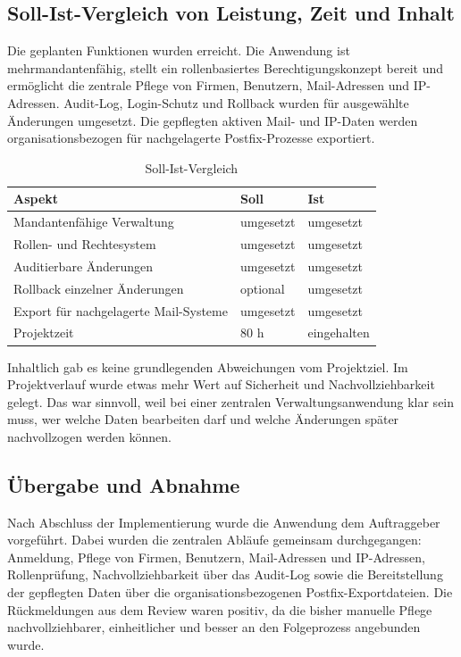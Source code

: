 \subsection{Soll-Ist-Vergleich von Leistung, Zeit und Inhalt}
\label{sec:SollIstVergleich}
Die geplanten Funktionen wurden erreicht. Die Anwendung ist
mehrmandantenfähig, stellt ein rollenbasiertes Berechtigungskonzept bereit und
ermöglicht die zentrale Pflege von Firmen, Benutzern, Mail-Adressen
und IP-Adressen. Audit-Log, Login-Schutz und Rollback wurden für ausgewählte
Änderungen umgesetzt. Die gepflegten aktiven Mail- und IP-Daten
werden organisationsbezogen für nachgelagerte Postfix-Prozesse
exportiert.

\begin{table}[htbp]
\centering
\begin{tabular}{|p{5.8cm}|p{2.3cm}|p{2.8cm}|}
\hline
\textbf{Aspekt} & \textbf{Soll} & \textbf{Ist} \\
\hline
Mandantenfähige Verwaltung & umgesetzt & umgesetzt \\
\hline
Rollen- und Rechtesystem & umgesetzt & umgesetzt \\
\hline
Auditierbare Änderungen & umgesetzt & umgesetzt \\
\hline
Rollback einzelner Änderungen & optional & umgesetzt \\
\hline
Export für nachgelagerte Mail-Systeme & umgesetzt & umgesetzt \\
\hline
Projektzeit & 80 h & eingehalten \\
\hline
\end{tabular}
\caption{Soll-Ist-Vergleich}
\label{tab:SollIst}
\end{table}

Inhaltlich gab es keine grundlegenden Abweichungen vom Projektziel. Im
Projektverlauf wurde etwas mehr Wert auf Sicherheit und Nachvollziehbarkeit
gelegt. Das war sinnvoll, weil bei einer zentralen Verwaltungsanwendung klar
sein muss, wer welche Daten bearbeiten darf und welche Änderungen später
nachvollzogen werden können.

\subsection{Übergabe und Abnahme}
\label{sec:UebergabeUndAbnahme}
Nach Abschluss der Implementierung wurde die Anwendung dem Auftraggeber
vorgeführt. Dabei wurden die zentralen Abläufe gemeinsam durchgegangen:
Anmeldung, Pflege von Firmen, Benutzern, Mail-Adressen und IP-Adressen,
Rollenprüfung, Nachvollziehbarkeit über das Audit-Log sowie die Bereitstellung
der gepflegten Daten über die organisationsbezogenen Postfix-Exportdateien. Die
Rückmeldungen aus dem Review waren positiv, da die bisher manuelle Pflege
nachvollziehbarer, einheitlicher und besser an den Folgeprozess angebunden
wurde.

